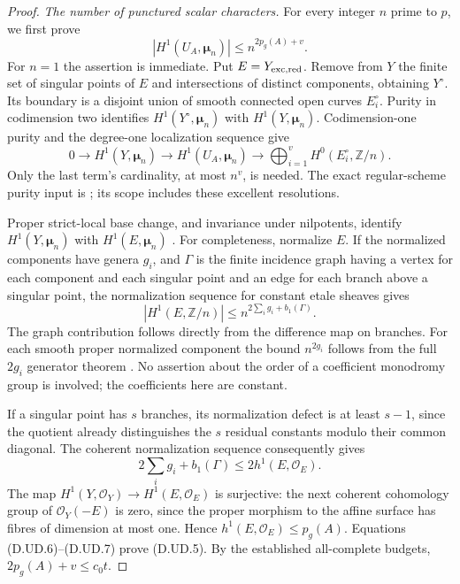 \begin{proof}
\emph{The number of punctured scalar characters.}
For every integer $n$ prime to $p$, we first prove
\[
       |H^1(U_A,\boldsymbol\mu_n)|
                         \le n^{2p_g(A)+v}.             \tag{D.UD.5}
\]
For $n=1$ the assertion is immediate. Put $E=Y_{\rm exc,red}$.
Remove from $Y$ the finite set of singular points of $E$ and
intersections of distinct components, obtaining $Y^\circ$.
Its boundary is a disjoint union of smooth connected open
curves $E_i^\circ$. Purity in codimension two identifies
$H^1(Y^\circ,\boldsymbol\mu_n)$ with
$H^1(Y,\boldsymbol\mu_n)$. Codimension-one purity and the
degree-one localization sequence give
\[
 0\longrightarrow H^1(Y,\boldsymbol\mu_n)
 \longrightarrow H^1(U_A,\boldsymbol\mu_n)
 \longrightarrow\bigoplus_{i=1}^{v}
                       H^0(E_i^\circ,\mathbb Z/n).
                                                        \tag{D.UD.6}
\]
Only the last term's cardinality, at most $n^v$, is needed.
The exact regular-scheme purity input is
\citet[Expose XVI, Theorem 3.1.1 and Corollary 3.1.3]
{A_ILO2014}; its scope includes these excellent resolutions.

Proper strict-local base change, and invariance under nilpotents,
identify $H^1(Y,\boldsymbol\mu_n)$ with
$H^1(E,\boldsymbol\mu_n)$
\citep[Theorem 59.91.11, Tag 095T]{StacksSemilinearDeterminantsB}.
For completeness, normalize $E$. If the normalized components
have genera $g_i$, and $\Gamma$ is the finite incidence graph
having a vertex for each component and each singular point and
an edge for each branch above a singular point, the normalization
sequence for constant etale sheaves gives
\[
 |H^1(E,\mathbb Z/n)|\le
                       n^{2\sum_i g_i+b_1(\Gamma)}.     \tag{D.UD.7}
\]
The graph contribution follows directly from the difference map
on branches. For each smooth proper normalized component the
bound $n^{2g_i}$ follows from the full $2g_i$ generator theorem
\citep[Expose X, Theorem 2.6 and its preceding argument]
{C_SGA1}. No assertion about the order of a coefficient monodromy
group is involved; the coefficients here are constant.

If a singular point has $s$ branches, its normalization defect
is at least $s-1$, since the quotient already distinguishes the
$s$ residual constants modulo their common diagonal. The
coherent normalization sequence consequently gives
\[
       2\sum_i g_i+b_1(\Gamma)
                              \le2h^1(E,\mathcal O_E).
\]
The map $H^1(Y,\mathcal O_Y)\to H^1(E,\mathcal O_E)$ is
surjective: the next coherent cohomology group of
$\mathcal O_Y(-E)$ is zero, since the proper morphism to the
affine surface has fibres of dimension at most one. Hence
$h^1(E,\mathcal O_E)\le p_g(A)$. Equations (D.UD.6)--(D.UD.7)
prove (D.UD.5). By the established all-complete budgets,
$2p_g(A)+v\le c_0t$.


\end{proof}
